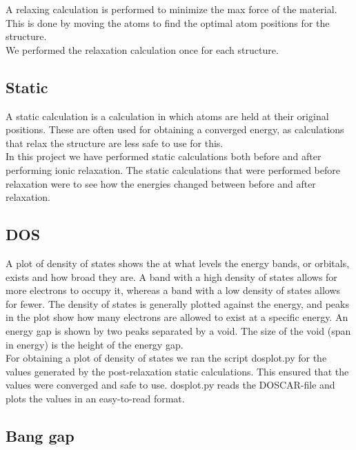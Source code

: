 \documentclass{article}
\begin{document}
    A relaxing calculation is performed to minimize the max force of the material. This is done by moving the atoms to find the optimal atom positions for the structure. \\

    We performed the relaxation calculation once for each structure. \\


  \subsection{Static}

    A static calculation is a calculation in which atoms are held at their original positions. These are often used for obtaining a converged energy, as calculations that relax the structure are less safe to use for this.\\

    In this project we have performed static calculations both before and after performing ionic relaxation. The static calculations that were performed before relaxation were to see how the energies changed between before and after relaxation. \\


  \subsection{DOS}

    A plot of density of states shows the at what levels the energy bands, or orbitals, exists and how broad they are. A band with a high density of states allows for more electrons to occupy it, whereas a band with a low density of states allows for fewer. The density of states is generally plotted against the energy, and peaks in the plot show how many electrons are allowed to exist at a specific energy. An energy gap is shown by two peaks separated by a void. The size of the void (span in energy) is the height of the energy gap. \\

    For obtaining a plot of density of states we ran the script dosplot.py for the values generated by the post-relaxation static calculations. This ensured that the values were converged and safe to use. dosplot.py reads the DOSCAR-file and plots the values in an easy-to-read format. \\


  \subsection{Bang gap}
\end{document}
